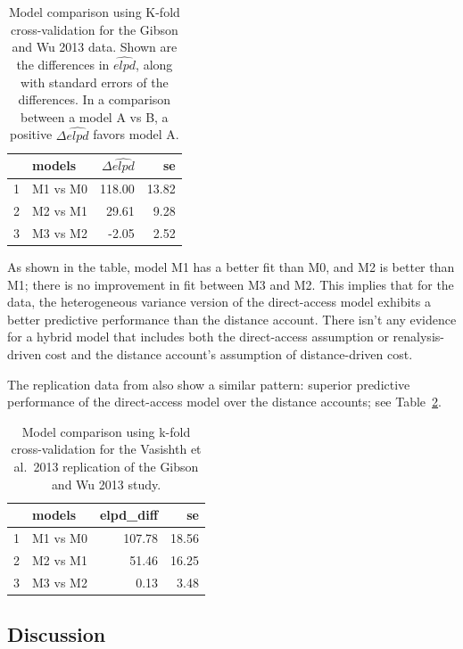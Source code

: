 \documentclass{cambridge7A}\usepackage[]{graphicx}\usepackage[]{color}
\begin{document}
\begin{table}[!htbp]
\centering
\begin{tabular}{rlrr}
  \hline
 & models & $\Delta \widehat{elpd}$ & se \\ 
  \hline
1 & M1 vs M0 & 118.00 & 13.82 \\ 
  2 & M2 vs M1 & 29.61 & 9.28 \\ 
  3 & M3 vs M2 & -2.05 & 2.52 \\ 
   \hline
\end{tabular}
\caption{Model comparison using K-fold cross-validation for the Gibson and Wu 2013 data. Shown are the differences in $\widehat{elpd}$, along with standard errors of the differences. In a comparison between a model A vs B, a positive $\Delta\widehat{elpd}$ favors model A.} 
\label{tab:modcompgibsonwu}
\end{table}

As shown in the table, model M1 has  a better fit than M0, and M2 is better than M1; there is no improvement in fit between M3 and M2. This implies that for the \cite{gibsonwu} data, the heterogeneous variance version of the direct-access model exhibits a better predictive performance than the distance account. There isn't any evidence for a hybrid model that includes both the direct-access assumption or renalysis-driven cost and the distance account's assumption of distance-driven cost.

The replication data from \cite{VasishthetalPLoSOne2013} also show a similar pattern: superior predictive performance of the direct-access model over the distance accounts; see Table~\ref{tab:modcompgibsonwurep}. 

\begin{table}[!htbp]
\centering
\begin{tabular}{rlrr}
  \hline
 & models & elpd\_diff & se \\ 
  \hline
1 & M1 vs M0 & 107.78 & 18.56 \\ 
  2 & M2 vs M1 & 51.46 & 16.25 \\
  3 & M3 vs M2 & 0.13 & 3.48 \\
   \hline
\end{tabular}
\caption{Model comparison using k-fold cross-validation for the Vasishth et al.\ 2013 replication of the Gibson and Wu 2013 study.} 
\label{tab:modcompgibsonwurep}
\end{table}


\subsection{Discussion}
\end{document}
